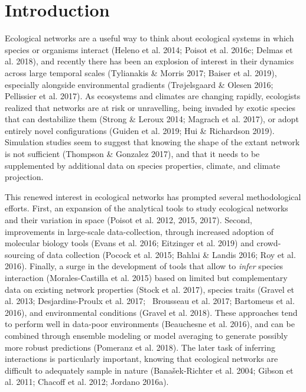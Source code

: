 \newcommand{\plusnamesingular}{}
\newcommand{\starnamesingular}{}
\newcommand{\xrefname}[1]{\protect\renewcommand{\plusnamesingular}{#1}}
\newcommand{\Xrefname}[1]{\protect\renewcommand{\starnamesingular}{#1}}
\providecommand{\cref}{\plusnamesingular~\ref}
\providecommand{\Cref}{\starnamesingular~\ref}
\providecommand{\crefformat}[2]{}
\providecommand{\Crefformat}[2]{}

\crefformat{figure}{fig.~#2#1#3}
\Crefformat{figure}{Figure~#2#1#3}

\hypertarget{introduction}{%
\section{Introduction}\label{introduction}}

Ecological networks are a useful way to think about ecological systems
in which species or organisms interact (Heleno et al. 2014; Poisot et
al. 2016c; Delmas et al. 2018), and recently there has been an explosion
of interest in their dynamics across large temporal scales (Tylianakis
\& Morris 2017; Baiser et al. 2019), especially alongside environmental
gradients (Trøjelsgaard \& Olesen 2016; Pellissier et al. 2017). As
ecosystems and climates are changing rapidly, ecologists realized that
networks are at risk or unravelling, being invaded by exotic species
that can destabilize them (Strong \& Leroux 2014; Magrach et al. 2017),
or adopt entirely novel configurations (Guiden et al. 2019; Hui \&
Richardson 2019). Simulation studies seem to suggest that knowing the
shape of the extant network is not sufficient (Thompson \& Gonzalez
2017), and that it needs to be supplemented by additional data on
species properties, climate, and climate projection.

This renewed interest in ecological networks has prompted several
methodological efforts. First, an expansion of the analytical tools to
study ecological networks and their variation in space (Poisot et al.
2012, 2015, 2017). Second, improvements in large-scale data-collection,
through increased adoption of molecular biology tools (Evans et al.
2016; Eitzinger et al. 2019) and crowd-sourcing of data collection
(Pocock et al. 2015; Bahlai \& Landis 2016; Roy et al. 2016). Finally, a
surge in the development of tools that allow to \emph{infer} species
interaction (Morales-Castilla et al. 2015) based on limited but
complementary data on existing network properties (Stock et al. 2017),
species traits (Gravel et al. 2013; Desjardins-Proulx et al. 2017;
~Brousseau et al. 2017; Bartomeus et al. 2016), and environmental
conditions (Gravel et al. 2018). These approaches tend to perform well
in data-poor environments (Beauchesne et al. 2016), and can be combined
through ensemble modeling or model averaging to generate possibly more
robust predictions (Pomeranz et al. 2018). The later task of inferring
interactions is particularly important, knowing that ecological networks
are difficult to adequately sample in nature (Banašek-Richter et al.
2004; Gibson et al. 2011; Chacoff et al. 2012; Jordano 2016a).

